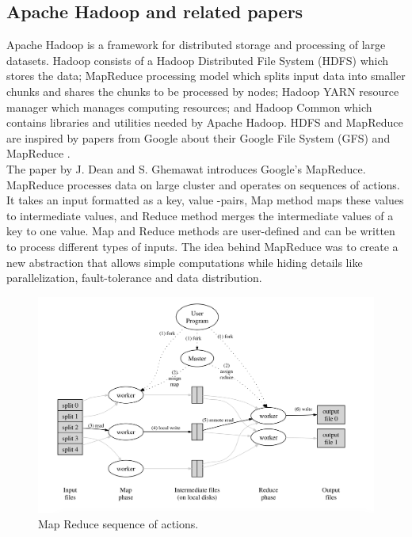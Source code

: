 \documentclass{article}
\theoremstyle{definition}
\begin{document}
\subsection{Apache Hadoop and related papers}
Apache Hadoop is a framework for distributed storage and processing of large datasets. Hadoop consists of a Hadoop Distributed File System (HDFS) which stores the data; MapReduce processing model which splits input data into smaller chunks and shares the chunks to be processed by nodes; Hadoop YARN resource manager which manages computing resources; and Hadoop Common which contains libraries and utilities needed by Apache Hadoop. HDFS and MapReduce are inspired by papers from Google about their Google File System (GFS) \cite{Ghemawat2003} and MapReduce \cite{Dean}. \\ 

The paper \cite{Dean} by J. Dean and S. Ghemawat introduces Google's MapReduce. MapReduce processes data on large cluster and operates on sequences of actions. It takes an input formatted as a key, value -pairs, Map method maps these values to intermediate values, and Reduce method merges the intermediate values of a key to one value. Map and Reduce methods are user-defined and can be written to process different types of inputs. The idea behind MapReduce was to create a new abstraction that allows simple computations while hiding details like parallelization, fault-tolerance and data distribution. \\

\begin{figure}[H]
\centering
\includegraphics[scale=0.4]{mapreducefigure}
\caption{Map Reduce sequence of actions. }
\end{figure}
\end{document}
